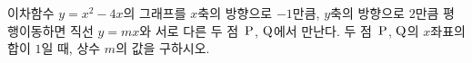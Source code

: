 이차함수 $y=x^2-4x$의 그래프를 $x$축의 방향으로 $-1$만큼, $y$축의 방향으로 $2$만큼 평행이동하면 직선 $y=mx$와 서로 다른 두 점~$\mathrm{P}$, $\mathrm{Q}$에서 만난다. 두 점~$\mathrm{P}$, $\mathrm{Q}$의 $x$좌표의 합이 $1$일 때, 상수 $m$의 값을 구하시오.

